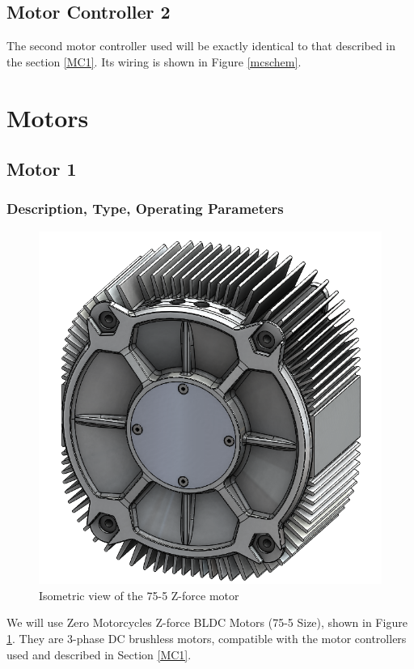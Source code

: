 \documentclass{article}
\begin{document}
    \subsection{Motor Controller 2} \label{MC2}

        The second motor controller used will be exactly identical to that described in the section \ref{MC1}. Its wiring is shown in Figure \ref{mcschem}.

\newpage

\section{Motors} \label{Motors}

    \subsection{Motor 1} \label{M1}

        \subsubsection{Description, Type, Operating Parameters}


            \begin{figure}[H]
                \centering
                \includegraphics[width = 0.5 \textwidth]{motor_isorear}
                \caption{Isometric view of the 75-5 Z-force motor}
                \label{motoriso}
            \end{figure}

            We will use Zero Motorcycles Z-force BLDC Motors (75-5 Size), shown in Figure \ref{motoriso}. They are 3-phase DC brushless motors, compatible with the motor controllers used and described in Section \ref{MC1}.
\end{document}
